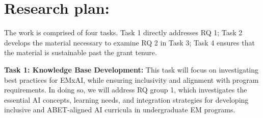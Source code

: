 \documentclass[11pt]{article}
\begin{document}
\section{Research plan:} The work is comprised of four tasks.
Task 1 directly addresses RQ 1; Task 2 develops the material necessary to examine RQ 2 in Task 3; Task 4 ensures that the material is sustainable past the grant tenure.

\begin{tcolorbox}[colback=mycmykcolor, colframe=black, boxrule=1pt, coltext=black]
\textbf{Task 1: Knowledge Base Development:} This task will focus on investigating best practices for EMxAI, while ensuring inclusivity and alignment with program requirements. In doing so, we will address RQ group 1, which investigates the essential AI concepts, learning needs, and integration strategies for developing inclusive and ABET-aligned AI curricula in undergraduate EM programs.
\end{tcolorbox}
\end{document}
